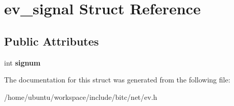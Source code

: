 \hypertarget{structev__signal}{\section{ev\-\_\-signal Struct Reference}
\label{structev__signal}
}
\subsection*{Public Attributes}
\begin{DoxyCompactItemize}
\item 
\hypertarget{structev__signal_a6e2aa67420522727edd77c291bc29cbe}{int {\bfseries signum}}\label{structev__signal_a6e2aa67420522727edd77c291bc29cbe}

\end{DoxyCompactItemize}


The documentation for this struct was generated from the following file\-:\begin{DoxyCompactItemize}
\item 
/home/ubuntu/workspace/include/bitc/net/ev.\-h\end{DoxyCompactItemize}
